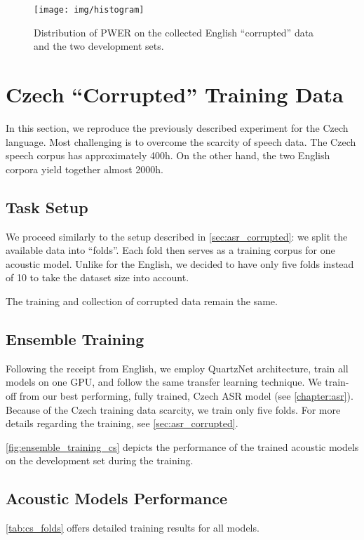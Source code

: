 \begin{figure}[t]
	\texttt{[image: img/histogram]}
	\caption{Distribution of PWER on the collected English ``corrupted'' data and the two development sets.}
	\label{fig:histogram}
\end{figure}









\section{Czech ``Corrupted'' Training Data}
\label{sec:asr_corrupted_cs}
In this section, we reproduce the previously described experiment for the Czech language. Most challenging is to overcome the scarcity of speech data. The Czech speech corpus has approximately 400h. On the other hand, the two English corpora yield together almost 2000h.

\subsection{Task Setup}
We proceed similarly to the setup described in \cref{sec:asr_corrupted}: we split the available data into ``folds''. Each fold then serves as a training corpus for one acoustic model. Unlike for the English, we decided to have only five folds instead of 10 to take the dataset size into account.

The training and collection of corrupted data remain the same.

\subsection{Ensemble Training}
Following the receipt from English, we employ QuartzNet architecture, train all models on one GPU, and follow the same transfer learning technique. We train-off from our best performing, fully trained, Czech ASR model (see \cref{chapter:asr}). Because of the Czech training data scarcity, we train only five folds. For more details regarding the training, see \cref{sec:asr_corrupted}.

\cref{fig:ensemble_training_cs} depicts the performance of the trained acoustic models on the development set during the training.

\subsection{Acoustic Models Performance}
\cref{tab:cs_folds} offers detailed training results for all models. 

